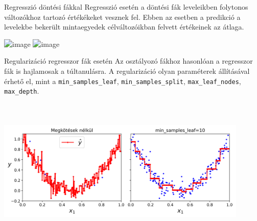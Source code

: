\documentclass[english, aspectratio=169]{beamer}
\begin{document}
\begin{frame}{Regresszió döntési fákkal}
Regresszió esetén a döntési fák leveleikben folytonos változókhoz tartozó értékékeket vesznek fel. Ebben az esetben a predikció a levelekbe bekerült mintaegyedek célváltozóikban felvett értékeinek az átlaga. 
\begin{center}
\includegraphics<1>[width=12cm, height=7cm, keepaspectratio]{graphs/decision_trees_9.png}
\includegraphics<2>[width=12cm, height=7cm, keepaspectratio]{images/decision_trees_6.png}
\end{center}
\end{frame}

\begin{frame}{Regularizáció regresszor fák esetén}
Az osztályozó fákhoz hasonlóan a regresszor fák is hajlamosak a túltanulásra. A regularizáció olyan paraméterek állításával érhető el, mint a \texttt{min\_samples\_leaf}, \texttt{min\_samples\_split}, \texttt{max\_leaf\_nodes}, \texttt{max\_depth}.
\begin{center}
\includegraphics[width=12cm, height=7cm, keepaspectratio]{images/decision_trees_7.png}
\end{center}
\end{frame}
\end{document}
